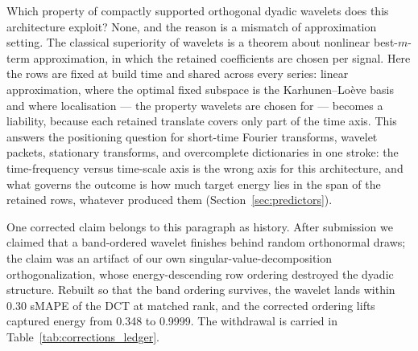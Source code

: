 Which property of compactly supported orthogonal dyadic wavelets
\citep{mallat1989wavelet} does this architecture exploit? None, and the
reason is a mismatch of approximation setting. The classical superiority
of wavelets is a theorem about nonlinear best-$m$-term approximation, in
which the retained coefficients are chosen per signal. Here the rows are
fixed at build time and shared across every series: linear approximation,
where the optimal fixed subspace is the Karhunen--Lo\`eve basis and where
localisation --- the property wavelets are chosen for --- becomes a
liability, because each retained translate covers only part of the time
axis. This answers the positioning question for short-time Fourier
transforms, wavelet packets, stationary transforms, and overcomplete
dictionaries in one stroke: the time-frequency versus time-scale axis is
the wrong axis for this architecture, and what governs the outcome is how
much target energy lies in the span of the retained rows, whatever
produced them (Section~\ref{sec:predictors}).

One corrected claim belongs to this paragraph as history. After
submission we claimed that a band-ordered wavelet finishes behind random
orthonormal draws; the claim was an artifact of our own
singular-value-decomposition orthogonalization, whose energy-descending
row ordering destroyed the dyadic structure. Rebuilt so that the band
ordering survives, the wavelet lands within 0.30 sMAPE of the DCT at
matched rank, and the corrected ordering lifts captured energy from 0.348
to 0.9999. The withdrawal is carried in
Table~\ref{tab:corrections_ledger}.

